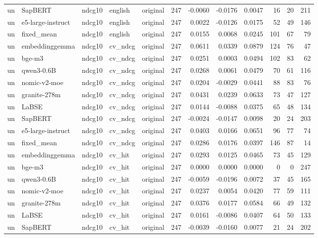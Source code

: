 \begin{tabular}{lllllrrrrrrr}
un & SapBERT & ndcg10 & english & original & 247 & -0.0060 & -0.0176 & 0.0047 & 16 & 20 & 211 \\
un & e5-large-instruct & ndcg10 & english & original & 247 & 0.0022 & -0.0126 & 0.0175 & 52 & 49 & 146 \\
un & fixed\_mean & ndcg10 & english & original & 247 & 0.0155 & 0.0068 & 0.0245 & 101 & 67 & 79 \\
un & embeddinggemma & ndcg10 & cv\_ndcg & original & 247 & 0.0611 & 0.0339 & 0.0879 & 124 & 76 & 47 \\
un & bge-m3 & ndcg10 & cv\_ndcg & original & 247 & 0.0251 & 0.0003 & 0.0494 & 102 & 83 & 62 \\
un & qwen3-0.6B & ndcg10 & cv\_ndcg & original & 247 & 0.0268 & 0.0061 & 0.0479 & 70 & 61 & 116 \\
un & nomic-v2-moe & ndcg10 & cv\_ndcg & original & 247 & 0.0204 & -0.0029 & 0.0441 & 88 & 83 & 76 \\
un & granite-278m & ndcg10 & cv\_ndcg & original & 247 & 0.0431 & 0.0239 & 0.0633 & 73 & 47 & 127 \\
un & LaBSE & ndcg10 & cv\_ndcg & original & 247 & 0.0144 & -0.0088 & 0.0375 & 65 & 48 & 134 \\
un & SapBERT & ndcg10 & cv\_ndcg & original & 247 & -0.0024 & -0.0147 & 0.0098 & 20 & 24 & 203 \\
un & e5-large-instruct & ndcg10 & cv\_ndcg & original & 247 & 0.0403 & 0.0166 & 0.0651 & 96 & 77 & 74 \\
un & fixed\_mean & ndcg10 & cv\_ndcg & original & 247 & 0.0286 & 0.0176 & 0.0397 & 146 & 87 & 14 \\
un & embeddinggemma & ndcg10 & cv\_hit & original & 247 & 0.0293 & 0.0125 & 0.0465 & 73 & 45 & 129 \\
un & bge-m3 & ndcg10 & cv\_hit & original & 247 & 0.0000 & 0.0000 & 0.0000 & 0 & 0 & 247 \\
un & qwen3-0.6B & ndcg10 & cv\_hit & original & 247 & -0.0059 & -0.0196 & 0.0072 & 37 & 45 & 165 \\
un & nomic-v2-moe & ndcg10 & cv\_hit & original & 247 & 0.0237 & 0.0054 & 0.0420 & 77 & 59 & 111 \\
un & granite-278m & ndcg10 & cv\_hit & original & 247 & 0.0376 & 0.0177 & 0.0584 & 66 & 49 & 132 \\
un & LaBSE & ndcg10 & cv\_hit & original & 247 & 0.0161 & -0.0086 & 0.0407 & 64 & 50 & 133 \\
un & SapBERT & ndcg10 & cv\_hit & original & 247 & -0.0039 & -0.0160 & 0.0077 & 21 & 24 & 202 \\

\end{tabular}

